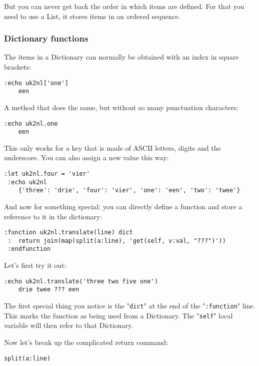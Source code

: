 But you can never get back the order in which items are defined.
For that you need to use a List, it stores items in an ordered sequence.
\subsubsection{Dictionary functions}
The items in a Dictionary can normally be obtained with an index in square brackets:

\begin{Verbatim}[samepage=true]
 :echo uk2nl['one']
    een
\end{Verbatim}

A method that does the same, but without so many punctuation characters:

\begin{Verbatim}[samepage=true]
 :echo uk2nl.one
    een
\end{Verbatim}

This only works for a key that is made of ASCII letters, digits and the underscore.
You can also assign a new value this way:

\begin{Verbatim}[samepage=true]
 :let uk2nl.four = 'vier'
 :echo uk2nl
    {'three': 'drie', 'four': 'vier', 'one': 'een', 'two': 'twee'}
\end{Verbatim}

And now for something special: you can directly define a function and store a reference to it in the dictionary:

\begin{Verbatim}[samepage=true]
 :function uk2nl.translate(line) dict
 :  return join(map(split(a:line), 'get(self, v:val, "???")'))
 :endfunction
\end{Verbatim}

Let's first try it out:

\begin{Verbatim}[samepage=true]
 :echo uk2nl.translate('three two five one')
    drie twee ??? een
\end{Verbatim}

The first special thing you notice is the "\texttt{dict}" at the end of the "\texttt{:function}" line.
This marks the function as being used from a Dictionary.
The "\texttt{self}" local variable will then refer to that Dictionary.

Now let's break up the complicated return command:

\begin{Verbatim}[samepage=true]
 split(a:line)
\end{Verbatim}

